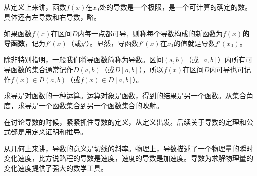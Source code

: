 从定义上来讲，函数$f\left( x \right) $在$x_0$处的导数是一个极限，是一个可计算的确定的数。具体还有左导数和右导数，略。

\begin{definition}[导函数]
如果函数$f\left( x \right) $在区间$D$内每一点都可导，则称每个导数构成的新函数为{\bf $f\left( x \right) $的导函数}，记为$f'\left( x \right) $（或$y'$）。显然，导函数$f'\left( x \right) $在$x_0$的值就是导数$f'\left( x_0 \right) $。
\end{definition}

除非特别指明，一般我们将导函数简称为导数。区间$\left( a,b \right) $（或$\left[ a,b \right] $）内所有可导函数的集合通常记作$D\left( a,b \right) $（或$D\left[ a,b \right] $），所以$f\left( x \right) $在区间$D$内可导也可记作$f\left( x \right) \in D\left( a,b \right) $（或$f\left( x \right) \in D\left[ a,b \right] $）。

求导是对函数的一种运算。运算对象是函数，得到的结果是另一个函数。从集合角度，求导是一个函数集合到另一个函数集合的映射。

\begin{tcolorbox}
在讨论导数的时候，紧紧抓住导数的定义，从定义出发。后续关于导数的定理和公式都是用定义证明和推导。
\end{tcolorbox}

从几何上来讲，导数的意义是切线的斜率。物理上，导数描述了一个物理量的瞬时变化速度，比方说路程的导数是速度，速度的导数是加速度。导数为求解物理量的变化速度提供了强大的数学工具。




